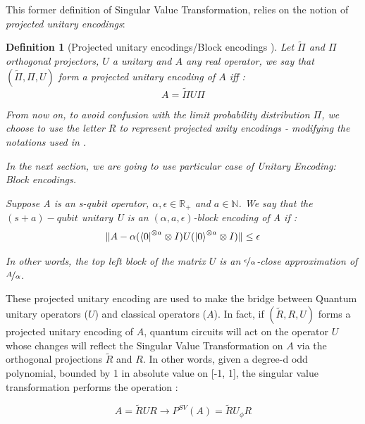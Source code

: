\documentclass[sn-mathphys]{sn-jnl}%
\theoremstyle{thmstyleone}%
\theoremstyle{thmstyletwo}%
\theoremstyle{thmstylethree}%
\newtheorem{definition}[theo]{Definition}
\begin{document}
This former definition of Singular Value Transformation, relies on the
notion of \textit{projected unitary encodings}:

\begin{definition}[Projected unitary encodings/Block encodings
  \cite{gilyen_su_low_wiebe_2019}]

  Let $\widetilde{\Pi}$ and $\Pi$ orthogonal projectors, $U$ a unitary
  and $A$ any real operator, we say that $(\widetilde{\Pi}, \Pi, U)$
  form a projected unitary encoding of $A$ iff :
\begin{equation}
    A = \widetilde{\Pi} U \Pi
\end{equation}

From now on, to avoid confusion with the limit probability
distribution $\Pi$, we choose to use the letter $R$ to represent
projected unity encodings - modifying the notations used in
\cite{gilyen_su_low_wiebe_2019}.

In the next section, we are going to use particular case of Unitary
Encoding: Block encodings.

Suppose A is an s-qubit operator, $\alpha, \epsilon \in \mathbb{R}_+$
and $a \in \mathbb{N}$. We say that the $(s+a)-qubit$ unitary U is an
$(\alpha, a, \epsilon)$-block encoding of A if :
\begin{equation}
    \|A - \alpha(\bra{0}^{\otimes a} \otimes I) U (\ket{0}^{\otimes a} \otimes I) \| \leq \epsilon
\end{equation}

In other words, the top left block of the matrix $U$ is an
$\nicefrac{\epsilon}{\alpha}$-close approximation of
$\nicefrac{A}{\alpha}$.

\end{definition}

These projected unitary encoding are used to make the bridge between
Quantum unitary operators ($U$) and classical operators ($A$). In
fact, if $(\widetilde{R}, R, U)$ forms a projected unitary encoding of
$A$, quantum circuits will act on the operator $U$ whose changes will
reflect the Singular Value Transformation on $A$ via the orthogonal
projections $\widetilde{R}$ and $R$. In other words, given a degree-d
odd polynomial, bounded by 1 in absolute value on [-1, 1], the
singular value transformation performs the operation :

\begin{equation}
    A = \widetilde{R} U R \rightarrow P^{SV}(A) = \widetilde{R} U_{\phi} R
\end{equation}
\end{document}
